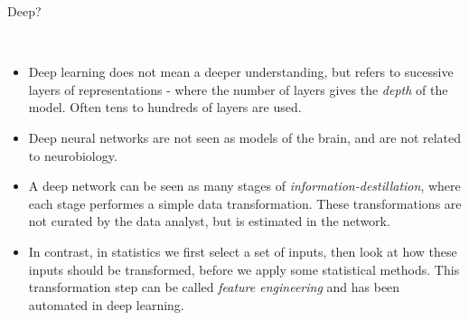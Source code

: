 \documentclass[10pt,ignorenonframetext,]{beamer}
\providecommand{\tightlist}{%
  \setlength{\itemsep}{0pt}\setlength{\parskip}{0pt}}
\begin{document}
\begin{frame}

\begin{block}{Deep?}

\(~\)

\begin{itemize}
\tightlist
\item
  Deep learning does not mean a deeper understanding, but refers to
  sucessive layers of representations - where the number of layers gives
  the \emph{depth} of the model. Often tens to hundreds of layers are
  used.
\end{itemize}

\vspace{2mm}

\begin{itemize}
\tightlist
\item
  Deep neural networks are not seen as models of the brain, and are not
  related to neurobiology.
\end{itemize}

\vspace{2mm}

\begin{itemize}
\tightlist
\item
  A deep network can be seen as many stages of
  \emph{information-destillation}, where each stage performes a simple
  data transformation. These transformations are not curated by the data
  analyst, but is estimated in the network.
\end{itemize}

\vspace{2mm}

\begin{itemize}
\tightlist
\item
  In contrast, in statistics we first select a set of inputs, then look
  at how these inputs should be transformed, before we apply some
  statistical methods. This transformation step can be called
  \emph{feature engineering} and has been automated in deep learning.
\end{itemize}

\end{block}

\end{frame}
\end{document}
